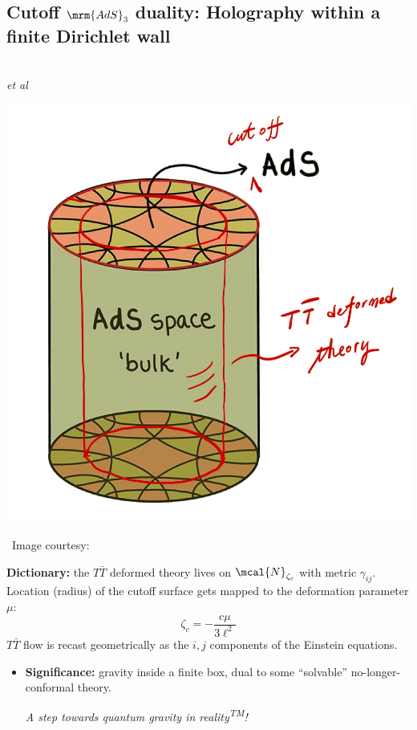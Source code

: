 \documentclass[10pt]{article}
\newcommand{\citations}[1]{{\footnotesize#1\par}}
\newcommand{\reality}{reality\textsuperscript{TM}}
\newcommand{\TTbar}{\texorpdfstring{\ensuremath{T\bar{T}}}{TTbar}\xspace}
\begin{document}
\begin{multicols}{3}
\begin{itemize}
\end{itemize}


\subsection*{Cutoff $\mrm{AdS}_3$ duality:\texstringonly{\\} Holography within a finite Dirichlet wall}

\citations{
\textcite{McGough:2016lol}\\
\textcite{Kraus:2018xrn} \textit{et al}
}\vspace{-.8\baselineskip}
\begin{center}
	\hspace{.1\linewidth}
	\includegraphics[width=.48\linewidth]{img/cutoff-ads.jpg}

	\vspace{-.5\baselineskip}
	\scriptsize\ Image courtesy: \textcite{AldegundePWSep22}
\end{center}
\textbf{Dictionary:} the \TTbar deformed theory lives on $\mcal{N}_{\zeta_c}$ with metric $\gamma_{ij}$.
Location (radius) of the cutoff surface gets mapped to the deformation parameter $\mu$:
\begin{equation}
	\zeta_c = - \frac{c \mu}{3\ell^2}
	\label{dictionary}
\end{equation}
\TTbar flow is recast geometrically as the $i,j$ components of the Einstein equations. 

\columnbreak



\begin{itemize}

\item \textbf{Significance:} gravity inside a finite box, dual to some ``solvable'' no-longer-conformal theory.

\textit{A step towards quantum gravity in \reality!}


\end{itemize}
\end{multicols}
\end{document}
